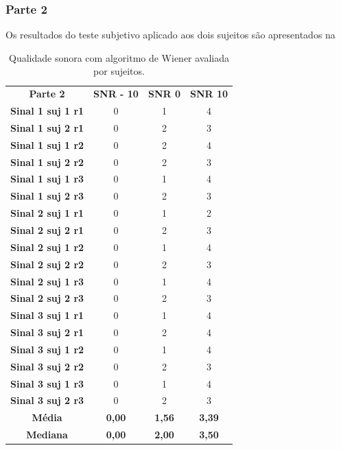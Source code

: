 \subsubsection{Parte 2}

Os resultados do teste subjetivo aplicado aos dois sujeitos são apresentados na 
\begin{table}[H]
\centering
\caption{Qualidade sonora com algoritmo de Wiener avaliada por sujeitos.}
\label{tabnumero2}
\begin{tabular}{cccc}
\textbf{\textbf{Parte 2}} & \textbf{SNR - 10} & \textbf{SNR 0} & \textbf{SNR 10} \\
\textbf{Sinal 1 suj 1 r1} & 0 & 1 & 4 \\
\textbf{Sinal 1 suj 2 r1} & 0 & 2 & 3 \\
\textbf{Sinal 1 suj 1 r2} & 0 & 2 & 4 \\
\textbf{Sinal 1 suj 2 r2} & 0 & 2 & 3 \\
\textbf{Sinal 1 suj 1 r3} & 0 & 1 & 4 \\
\textbf{Sinal 1 suj 2 r3} & 0 & 2 & 3 \\

\textbf{Sinal 2 suj 1 r1} & 0 & 1 & 2 \\
\textbf{Sinal 2 suj 2 r1} & 0 & 2 & 3 \\
\textbf{Sinal 2 suj 1 r2} & 0 & 1 & 4 \\
\textbf{Sinal 2 suj 2 r2} & 0 & 2 & 3 \\
\textbf{Sinal 2 suj 1 r3} & 0 & 1 & 4 \\
\textbf{Sinal 2 suj 2 r3} & 0 & 2 & 3 \\

\textbf{Sinal 3 suj 1 r1} & 0 & 1 & 4 \\
\textbf{Sinal 3 suj 2 r1} & 0 & 2 & 4 \\
\textbf{Sinal 3 suj 1 r2} & 0 & 1 & 4 \\
\textbf{Sinal 3 suj 2 r2} & 0 & 2 & 3 \\
\textbf{Sinal 3 suj 1 r3} & 0 & 1 & 4 \\
\textbf{Sinal 3 suj 2 r3} & 0 & 2 & 3 \\
\textbf{Média}  & \textbf{0,00} & \textbf{1,56} & \textbf{3,39}\\
\textbf{Mediana}  & \textbf{0,00} & \textbf{2,00} & \textbf{3,50}\\

\end{tabular}
\end{table}
